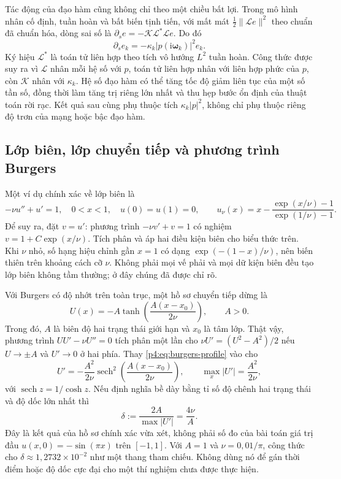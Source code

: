 Tác động của đạo hàm cũng không chỉ theo một chiều bất lợi. Trong
mô hình nhân cố định, tuần hoàn và bất biến tịnh tiến, với mất mát
$\tfrac12\|\mathcal{L}e\|^2$ theo chuẩn đã chuẩn hóa, dòng sai số là
$\partial_se=-\mathcal{K}\mathcal{L}^{*}\mathcal{L}e$.
Do đó
\begin{equation}
 \partial_se_k=-\kappa_k|p(\mathrm{i}\boldsymbol{\omega}_k)|^2e_k.
 \label{p4:eq:pinn-kernel-rate}
\end{equation}
Ký hiệu $\mathcal{L}^{*}$ là toán tử liên hợp theo tích vô hướng
$L^2$ tuần hoàn. Công thức được suy ra vì $\mathcal{L}$ nhân mỗi hệ
số với $p$, toán tử liên hợp nhân với liên hợp phức của $p$, còn
$\mathcal{K}$ nhân với $\kappa_k$. Hệ số đạo hàm có thể tăng tốc độ
giảm liên tục của một số tần số, đồng thời làm tăng trị riêng lớn
nhất và thu hẹp bước ổn định của thuật toán rời rạc. Kết quả sau cùng
phụ thuộc tích $\kappa_k|p|^2$, không chỉ phụ thuộc riêng độ trơn của
mạng hoặc bậc đạo hàm.

\subsection{Lớp biên, lớp chuyển tiếp và phương trình Burgers}

Một ví dụ chính xác về lớp biên là
\begin{equation}
 -\nu u''+u'=1,\quad 0<x<1,\quad u(0)=u(1)=0,
 \qquad
 u_\nu(x)=x-\frac{\exp(x/\nu)-1}{\exp(1/\nu)-1}.
 \label{p4:eq:boundary-layer}
\end{equation}
Để suy ra, đặt $v=u'$: phương trình $-\nu v'+v=1$ có nghiệm
$v=1+C\exp(x/\nu)$. Tích phân và áp hai điều kiện biên cho biểu thức
trên. Khi $\nu$ nhỏ, số hạng hiệu chỉnh gần $x=1$ có dạng
$\exp(-(1-x)/\nu)$, nên biến thiên trên khoảng cách cỡ $\nu$.
Không phải mọi vế phải và mọi dữ kiện biên đều tạo lớp biên không
tầm thường; ở đây chúng đã được chỉ rõ.

Với Burgers có độ nhớt trên toàn trục, một hồ sơ chuyển tiếp dừng là
\begin{equation}
 U(x)=-A\tanh\!\left(\frac{A(x-x_0)}{2\nu}\right),
 \qquad A>0.
 \label{p4:eq:burgers-profile}
\end{equation}
Trong đó, $A$ là biên độ hai trạng thái giới hạn và $x_0$ là tâm lớp.
Thật vậy, phương trình $UU'-\nu U''=0$ tích phân một lần cho
$\nu U'=(U^2-A^2)/2$ nếu $U\to\pm A$ và $U'\to0$ ở hai phía.
Thay \eqref{p4:eq:burgers-profile} vào cho
\[
 U'=-\frac{A^2}{2\nu}
       \operatorname{sech}^{2}\!\left(\frac{A(x-x_0)}{2\nu}\right),
 \qquad \max_x|U'|=\frac{A^2}{2\nu},
\]
với $\operatorname{sech}z=1/\cosh z$. Nếu định nghĩa bề dày bằng tỉ
số độ chênh hai trạng thái và độ dốc lớn nhất thì
\begin{equation}
 \delta:=\frac{2A}{\max|U'|}=\frac{4\nu}{A}.
 \label{p4:eq:layer-width}
\end{equation}
Đây là kết quả của hồ sơ chính xác vừa xét, không phải số đo của
bài toán giá trị đầu $u(x,0)=-\sin(\pi x)$ trên $[-1,1]$.
Với $A=1$ và $\nu=0{,}01/\pi$, công thức cho
$\delta\approx1{,}2732\times10^{-2}$ như một thang tham chiếu.
Không dùng nó để gán thời điểm hoặc độ dốc cực đại cho một thí nghiệm
chưa được thực hiện.

